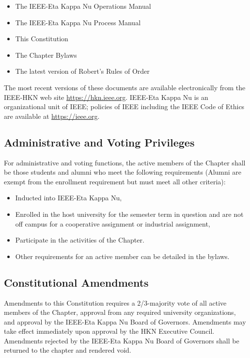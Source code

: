 \documentclass[11pt]{article}
\begin{document}
\begin{itemize}
\item The IEEE-Eta Kappa Nu Operations Manual
\item The IEEE-Eta Kappa Nu Process Manual
\item This Constitution
\item The Chapter Bylaws
\item The latest version of Robert’s Rules of Order
\end{itemize}

The most recent versions of these documents are available electronically from the IEEE-HKN web site \url{https://hkn.ieee.org}.
IEEE-Eta Kappa Nu is an organizational unit of IEEE; policies of IEEE including the IEEE Code of Ethics are available at \url{https://ieee.org}.

\subsection{Administrative and Voting Privileges}
\label{sec:org84e9e12}

For administrative and voting functions, the active members of the Chapter shall be those students and alumni who meet the following requirements (Alumni are exempt from the enrollment requirement but must meet all other criteria):

\begin{itemize}
\item Inducted into IEEE-Eta Kappa Nu,
\item Enrolled in the host university for the semester term in question and are not off campus for a cooperative assignment or industrial assignment,
\item Participate in the activities of the Chapter.
\item Other requirements for an active member can be detailed in the bylaws.
\end{itemize}

\subsection{Constitutional Amendments}
\label{sec:orgfa28aa0}

Amendments to this Constitution requires a 2/3-majority vote of all active members of the Chapter, approval from any required university organizations, and approval by the IEEE-Eta Kappa Nu Board of Governors.
Amendments may take effect immediately upon approval by the HKN Executive Council.
Amendments rejected by the IEEE-Eta Kappa Nu Board of Governors shall be returned to the chapter and rendered void.
\end{document}

